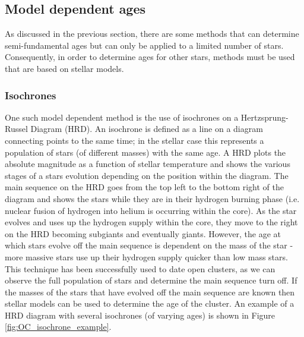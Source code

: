 \subsection{Model dependent ages}
As discussed in the previous section, there are some methods that can determine semi-fundamental ages but can only be applied to a limited number of stars. Consequently, in order to determine ages for other stars, methods must be used that are based on stellar models.

\subsubsection{Isochrones}
One such model dependent method is the use of isochrones on a Hertzsprung-Russel Diagram (HRD). An isochrone is defined as a line on a diagram connecting points to the same time; in the stellar case this represents a population of stars (of different masses) with the same age. A HRD plots the absolute magnitude as a function of stellar temperature and shows the various stages of a stars evolution depending on the position within the diagram. The main sequence on the HRD goes from the top left to the bottom right of the diagram and shows the stars while they are in their hydrogen burning phase (i.e. nuclear fusion of hydrogen into helium is occurring within the core). As the star evolves and uses up the hydrogen supply within the core, they move to the right on the HRD becoming subgiants and eventually giants. However, the age at which stars evolve off the main sequence is dependent on the mass of the star - more massive stars use up their hydrogen supply quicker than low mass stars. This technique has been successfully used to date open clusters, as we can observe the full population of stars and determine the main sequence turn off. If the masses of the stars that have evolved off the main sequence are known then stellar models can be used to determine the age of the cluster. An example of a HRD diagram with several isochrones (of varying ages) is shown in Figure \ref{fig:OC_isochrone_example}.

